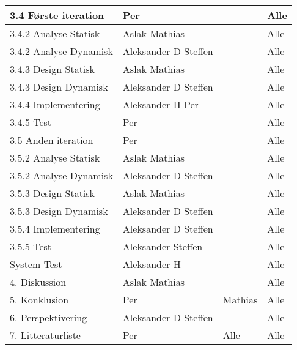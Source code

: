 \begin{center}
\begin{longtable}{|m{5.8cm}|m{3.5cm}|m{3.5cm}|m{3.2cm}|}
3.4 Første iteration & Per & & Alle\\ \hline
3.4.2 Analyse Statisk & Aslak \newline Mathias & & Alle\\ \hline
3.4.2 Analyse Dynamisk & Aleksander D \newline Steffen & & Alle\\ \hline
3.4.3 Design Statisk & Aslak \newline Mathias  & & Alle\\ \hline
3.4.3 Design Dynamisk & Aleksander D \newline Steffen &  & Alle\\ \hline
3.4.4 Implementering & Aleksander H \newline Per & & Alle\\ \hline
3.4.5 Test & Per & & Alle\\ \hline

3.5 Anden iteration & Per & & Alle\\ \hline
3.5.2 Analyse Statisk & Aslak \newline Mathias & & Alle\\ \hline
3.5.2 Analyse Dynamisk & Aleksander D \newline Steffen & & Alle\\ \hline
3.5.3 Design Statisk & Aslak \newline Mathias  & & Alle\\ \hline
3.5.3 Design Dynamisk & Aleksander D \newline Steffen &  & Alle\\ \hline
3.5.4 Implementering & Aleksander D \newline Steffen & & Alle\\ \hline
3.5.5 Test & Aleksander \newline Steffen & & Alle\\ \hline
System Test & Aleksander H & & Alle\\ \hline

4. Diskussion & Aslak \newline Mathias& & Alle\\ \hline

5. Konklusion & Per & Mathias & Alle\\ \hline

6. Perspektivering & Aleksander D \newline Steffen& & Alle\\ \hline

7. Litteraturliste & Per & Alle & Alle\\ \hline


\end{longtable}
\end{center}
